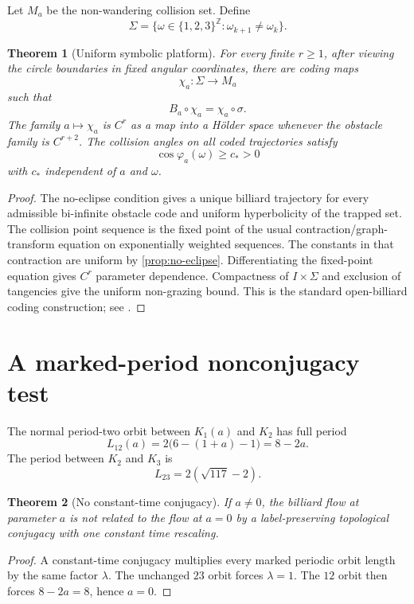\documentclass[11pt,reqno]{amsart}
\newtheorem{theorem}{Theorem}[section]
\theoremstyle{definition}
\theoremstyle{remark}
\begin{document}
Let $M_a$ be the non-wandering collision set.  Define
\[
 \Sigma=\{\omega\in\{1,2,3\}^{\mathbb Z}:
 \omega_{k+1}\ne\omega_k\}.
\]

\begin{theorem}[Uniform symbolic platform]\label{thm:coding}
For every finite $r\ge1$, after viewing the circle boundaries in fixed angular
coordinates, there are coding maps
\[
 \chi_a:\Sigma\longrightarrow M_a
\]
such that
\[
 B_a\circ\chi_a=\chi_a\circ\sigma.
\]
The family $a\mapsto\chi_a$ is $C^r$ as a map into a Hölder space whenever the
obstacle family is $C^{r+2}$.  The collision angles on all coded trajectories
satisfy
\[
 \cos\varphi_a(\omega)\ge c_*>0
\]
with $c_*$ independent of $a$ and $\omega$.
\end{theorem}

\begin{proof}
The no-eclipse condition gives a unique billiard trajectory for every
admissible bi-infinite obstacle code and uniform hyperbolicity of the trapped
set.  The collision point sequence is the fixed point of the usual
contraction/graph-transform equation on exponentially weighted sequences.
The constants in that contraction are uniform by \cref{prop:no-eclipse}.
Differentiating the fixed-point equation gives $C^r$ parameter dependence.
Compactness of $I\times\Sigma$ and exclusion of tangencies give the uniform
non-grazing bound.  This is the standard open-billiard coding construction;
see \cite{ChernovMarkarian2006,Wright2016}.
\end{proof}

\section{A marked-period nonconjugacy test}\label{sec:nonconjugacy}

The normal period-two orbit between $K_1(a)$ and $K_2$ has full period
\[
 L_{12}(a)=2\bigl(6-(1+a)-1\bigr)=8-2a.
\]
The period between $K_2$ and $K_3$ is
\[
 L_{23}=2(\sqrt{117}-2).
\]

\begin{theorem}[No constant-time conjugacy]\label{thm:nonconjugacy}
If $a\ne0$, the billiard flow at parameter $a$ is not related to the flow at
$a=0$ by a label-preserving topological conjugacy with one constant time
rescaling.
\end{theorem}

\begin{proof}
A constant-time conjugacy multiplies every marked periodic orbit length by the
same factor $\lambda$.  The unchanged $23$ orbit forces $\lambda=1$.  The
$12$ orbit then forces $8-2a=8$, hence $a=0$.
\end{proof}
\end{document}
